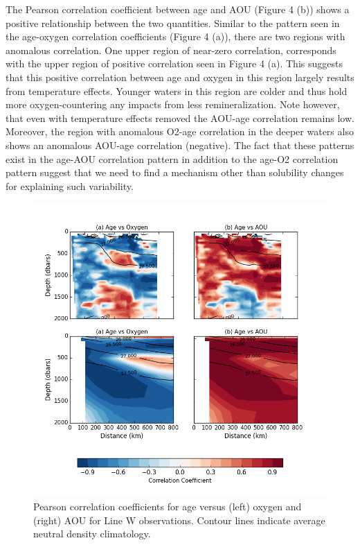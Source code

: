 The Pearson correlation coefficient between age and AOU (Figure 4 (b)) shows a positive relationship between the two quantities.  Similar to the pattern seen in the age-oxygen correlation coefficients (Figure 4 (a)), there are two regions with anomalous correlation. One upper region of near-zero correlation, corresponds with the upper region of positive correlation seen in Figure 4 (a). This suggests that this positive correlation between age and oxygen in this region largely results from temperature effects. Younger waters in this region are colder and thus hold more oxygen-countering any impacts from less remineralization. Note however, that even with temperature effects removed the AOU-age correlation remains low. Moreover, the region with anomalous O2-age correlation in the deeper waters also shows an anomalous AOU-age correlation (negative).  The fact that these patterns exist in the age-AOU correlation pattern in addition to the age-O2 correlation pattern suggest that we need to find a mechanism other than solubility changes for explaining such variability.

\begin{figure}
\centering
\includegraphics[width=\linewidth]{correlation.png}
\caption{Pearson correlation coefficients for age versus (left) oxygen and (right) AOU for Line W observations. Contour lines indicate average neutral density climatology.}
\label{fig:fig4}
\end{figure}

